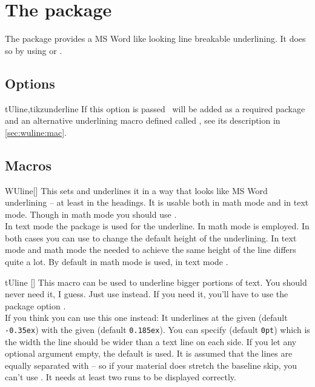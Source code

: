 \chapter{The  package}
The package provides a MS Word like looking line breakable underlining. It does
so by using  or .

\section{Options}\label{sec:wuline:options}%
\begin{describeopt}{tUline,tikzunderline}
  If this option is passed \TikZ\ will be added as a required package and an
  alternative underlining macro defined called , see its description
  in \autoref{sec:wuline:mac}.
\end{describeopt}

\section{Macros}\label{sec:wuline:mac}%
\begin{describemacro}{WUline}[]%
  This sets  and underlines it in a way that looks like MS Word
  underlining -- at least in the headings. It is usable both in math mode and in
  text mode. Though in math mode you should use .\\[\parskip]
  In text mode the  package is used for the underline. In math mode
   is employed. In both cases you can use  to
  change the default height of the underlining. In text mode and math mode the
  needed  to achieve the same height of the line differs quite a
  lot. By default in math mode \texttt{} is
  used, in text mode \texttt{}.
\end{describemacro}%
\begin{describemacro}{tUline}%
  []
  This macro can be used to underline bigger portions of text. You should never
  need it, I guess. Just use  instead. If you need it, you'll have to
  use the package option .\\[\parskip]
  If you think you can use this one instead: It underlines  at the
  given  (default \texttt{-0.35ex}) with the given 
  (default \texttt{0.185ex}). You can specify  (default
  \texttt{0pt}) which is the width the line should be wider than a text line on
  each side. If you let any optional argument empty, the default is used. It is
  assumed that the lines are equally separated with  -- so if
  your material does stretch the baseline skip, you can't use . It
  needs at least two runs to be displayed correctly.
\end{describemacro}%

